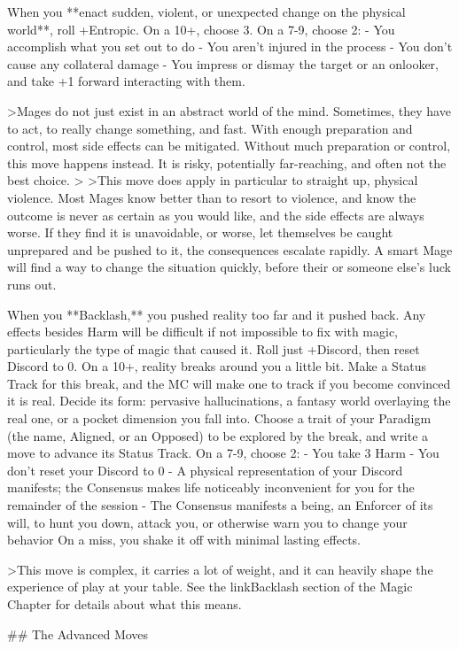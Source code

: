 \documentclass[
  oneside,
  statementpaper,
  9pt]{memoir}
\begin{document}
\begin{Player}
When you **enact sudden, violent, or unexpected change on the physical world**, roll +Entropic. On a 10+, choose 3. On a 7-9, choose 2:
- You accomplish what you set out to do
- You aren’t injured in the process
- You don’t cause any collateral damage
- You impress or dismay the target or an onlooker, and take +1 forward interacting with them.

>Mages do not just exist in an abstract world of the mind. Sometimes, they have to act, to really change something, and fast. With enough preparation and control, most side effects can be mitigated. Without much preparation or control, this move happens instead. It is risky, potentially far-reaching, and often not the best choice.
>
>This move does apply in particular to straight up, physical violence. Most Mages know better than to resort to violence, and know the outcome is never as certain as you would like, and the side effects are always worse. If they find it is unavoidable, or worse, let themselves be caught unprepared and be pushed to it, the consequences escalate rapidly. A smart Mage will find a way to change the situation quickly, before their or someone else’s luck runs out.

When you **Backlash,** you pushed reality too far and it pushed back. Any effects besides Harm will be difficult if not impossible to fix with magic, particularly the type of magic that caused it. Roll just +Discord, then reset Discord to 0. On a 10+, reality breaks around you a little bit. Make a Status Track for this break, and the MC will make one to track if you become convinced it is real. Decide its form: pervasive hallucinations, a fantasy world overlaying the real one, or a pocket dimension you fall into. Choose a trait of your Paradigm (the name, Aligned, or an Opposed) to be explored by the break, and write a move to advance its Status Track. 
On a 7-9, choose 2:
- You take 3 Harm
- You don’t reset your Discord to 0
- A physical representation of your Discord manifests; the Consensus makes life noticeably inconvenient for you for the remainder of the session
- The Consensus manifests a being, an Enforcer of its will, to hunt you down, attack you, or otherwise warn you to change your behavior 
On a miss, you shake it off with minimal lasting effects.

>This move is complex, it carries a lot of weight, and it can heavily shape the experience of play at your table. See the {{linkBacklash section}} of the Magic Chapter for details about what this means.

## The Advanced Moves


\end{Player}
\end{document}
